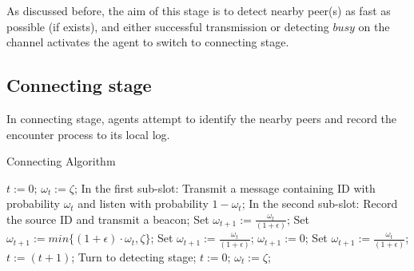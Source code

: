 As discussed before, the aim of this stage is to detect nearby peer(s) as fast as possible 
(if exists), and either successful transmission or detecting $busy$ on the channel activates the agent
to switch to connecting stage. %


\subsection{Connecting stage}

In connecting stage, agents attempt to identify the nearby 
peers and record the encounter process %
to its local log.

\begin{algorithm}[t]
    \caption{Connecting Algorithm}
    \label{CA}
    \begin{algorithmic}[1]
    \STATE $t := 0$; $\omega_t := \zeta$; 
        \STATE In the first sub-slot:
        \STATE Transmit a message containing ID with probability $\omega_t$
        and listen with probability $1-\omega_t$;
        \STATE In the second sub-slot:
                \STATE Record the source ID and transmit a beacon;
                \STATE Set $\omega_{t+1} := \frac{\omega_t}{(1+\epsilon)}$;
                \STATE Set $\omega_{t+1} := min\{(1+\epsilon)\cdot\omega_t, \zeta\}$;
            \ELSE
                \STATE Set $\omega_{t+1} := \frac{\omega_t}{(1+\epsilon)}$; %
            \ENDIF
        \ELSE%
                \STATE $\omega_{t+1} := 0$;
            \ELSE
                \STATE Set $\omega_{t+1} := \frac{\omega_t}{(1+\epsilon)}$;
            \ENDIF
        \ENDIF
        \STATE $t := (t + 1)$;
                \STATE Turn to detecting stage; \label{backDS}
            \ELSE
                \STATE $t := 0$; $\omega_t := \zeta$;
            \ENDIF
        \ENDIF
    \ENDWHILE
    \end{algorithmic}
\end{algorithm}



